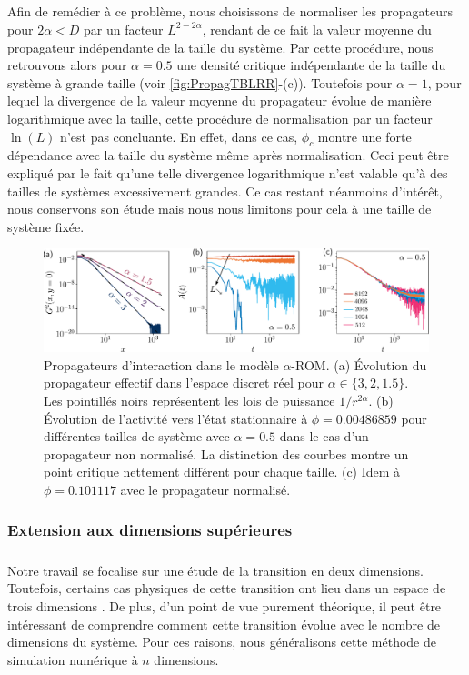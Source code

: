 \subparagraph{}Afin de remédier à ce problème, nous choisissons de normaliser les propagateurs pour $2\alpha<D$ par un facteur $L^{2-2\alpha}$, rendant de ce fait la valeur moyenne du propagateur indépendante de la taille du système. Par cette procédure, nous retrouvons alors pour $\alpha = 0.5$ une densité critique indépendante de la taille du système à grande taille (voir \autoref{fig:PropagTBLRR}-(c)). Toutefois pour $\alpha = 1$, pour lequel la divergence de la valeur moyenne du propagateur évolue de manière logarithmique avec la taille, cette procédure de normalisation par un facteur $\ln (L)$ n'est pas concluante. En effet, dans ce cas, $\phi_c$ montre une forte dépendance avec la taille du système même après normalisation. Ceci peut être expliqué par le fait qu'une telle divergence logarithmique n'est valable qu'à des tailles de systèmes excessivement grandes. Ce cas restant néanmoins d'intérêt, nous conservons son étude mais nous nous limitons pour cela à une taille de système fixée.

\begin{figure}[h]
	\centering
	\includegraphics[width=\textwidth]{Chapitre3/Figures/Method/PropagTBLRR2D.pdf}
	\caption{Propagateurs d'interaction dans le modèle $\alpha$-ROM. (a) Évolution du propagateur effectif dans l'espace discret réel pour $\alpha \in \{ 3, 2, 1.5 \}$. Les pointillés noirs représentent les lois de puissance $1/r^{2\alpha}$. (b) Évolution de l'activité vers l'état stationnaire à $\phi = 0.00486859$ pour différentes tailles de système avec $\alpha = 0.5$ dans le cas d'un propagateur non normalisé. La distinction des courbes montre un point critique nettement différent pour chaque taille. (c) Idem à $\phi=0.101117$ avec le propagateur normalisé.}
	\label{fig:PropagTBLRR}
\end{figure}

\subsubsection{Extension aux dimensions supérieures}

\subparagraph{}Notre travail se focalise sur une étude de la transition en deux dimensions. Toutefois, certains cas physiques de cette transition ont lieu dans un espace de trois dimensions \cite{pine_chaos_2005}. De plus, d'un point de vue purement théorique, il peut être intéressant de comprendre comment cette transition évolue avec le nombre de dimensions du système. Pour ces raisons, nous généralisons cette méthode de simulation numérique à $n$ dimensions.

